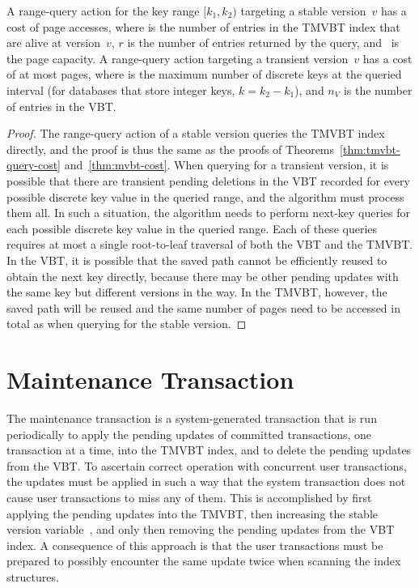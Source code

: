 \thmskip
\begin{theorem}
\label{theorem:cmvbt:range-query} 
A range-query action for the key range $[k_1, k_2)$ targeting a
stable version~$v$ has a cost of  page accesses, where  is the number of entries in the
TMVBT index that are alive at version~$v$, $r$ is the number of entries
returned by the query, and \capacity\ is the page capacity.
A range-query action targeting a transient version~$v$ has a cost of
at most  pages, where  is the maximum
number of discrete keys at the queried interval (for databases that store
integer keys, $k = k_2 - k_1$), and $n_V$ is the number of entries in the
VBT\@.
\end{theorem}
\begin{proof}
The range-query action of a stable version queries the TMVBT index directly,
and the proof is thus the same as the proofs of
Theorems~\ref{thm:tmvbt-query-cost} and~\ref{thm:mvbt-cost}.
When querying for a transient version, it is possible that there are
transient pending deletions in the VBT recorded for every possible discrete
key value in the queried range, and the algorithm must process them all.
In such a situation, the  algorithm needs to perform
next-key queries for each possible discrete key value in the queried range.
Each of these queries requires at most a single root-to-leaf traversal of
both the VBT and the TMVBT\@.
In the VBT, it is possible that the saved path cannot be efficiently reused
to obtain the next key directly, because there may be other pending updates
with the same key but different versions in the way.
In the TMVBT, however, the saved path will be reused and the same number of
pages need to be accessed in total as when querying for the stable version.
\end{proof}
\thmskip



\section{Maintenance Transaction}
\label{sec:cmvbt:maintenance-tx}

The maintenance transaction is a system-generated transaction that is run
periodically to apply the pending updates of committed transactions, one
transaction at a time, into the TMVBT index, and to delete the pending
updates from the VBT\@.
To ascertain correct operation with concurrent user transactions,
the updates must be applied in such a way that the system transaction
does not cause user transactions to miss any of them.
This is accomplished by first applying the pending updates into the
TMVBT, then increasing the stable version variable~\stablever,
and only then removing the pending updates from the VBT index.
A consequence of this approach is that the user transactions must be
prepared to possibly encounter the same update twice when scanning
the index structures. 

